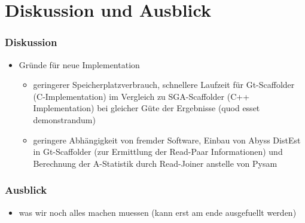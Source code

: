 \documentclass[xcolor=pst]{beamer}
\begin{document}
\section{Diskussion und Ausblick}
\begin{frame}
  \frametitle{Diskussion}
  \begin{itemize}
  \item Gründe für neue Implementation
    \begin{itemize}
    \item geringerer Speicherplatzverbrauch, schnellere Laufzeit
       für Gt-Scaffolder (C-Implementation) im Vergleich zu
       SGA-Scaffolder (C++ Implementation) bei gleicher Güte
       der Ergebnisse (quod esset demonstrandum)
    \item geringere Abhängigkeit von fremder Software, Einbau
      von Abyss DistEst in Gt-Scaffolder (zur Ermittlung der
      Read-Paar Informationen) und Berechnung der A-Statistik
      durch Read-Joiner anstelle von Pysam
    \end{itemize}
  \end{itemize}
\end{frame}

\begin{frame}
  \frametitle{Ausblick}
  \begin{itemize}
  \item was wir noch alles machen muessen (kann erst am ende
    ausgefuellt werden)
  \end{itemize}
\end{frame}
\end{document}
